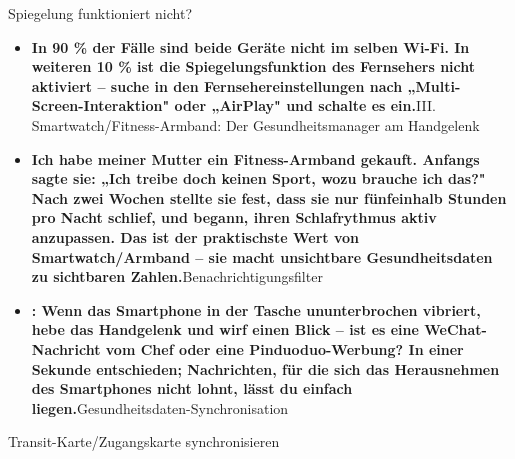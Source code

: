 


Spiegelung funktioniert nicht?

\begin{itemize}
  \item \textbf{In 90 \% der Fälle sind beide Geräte nicht im selben Wi-Fi. In weiteren 10 \% ist die Spiegelungsfunktion des Fernsehers nicht aktiviert – suche in den Fernsehereinstellungen nach „Multi-Screen-Interaktion" oder „AirPlay" und schalte es ein.}III. Smartwatch/Fitness-Armband: Der Gesundheitsmanager am Handgelenk
  \item \textbf{Ich habe meiner Mutter ein Fitness-Armband gekauft. Anfangs sagte sie: „Ich treibe doch keinen Sport, wozu brauche ich das?" Nach zwei Wochen stellte sie fest, dass sie nur fünfeinhalb Stunden pro Nacht schlief, und begann, ihren Schlafrythmus aktiv anzupassen. Das ist der praktischste Wert von Smartwatch/Armband – sie macht unsichtbare Gesundheitsdaten zu sichtbaren Zahlen.}Benachrichtigungsfilter
  \item \textbf{: Wenn das Smartphone in der Tasche ununterbrochen vibriert, hebe das Handgelenk und wirf einen Blick – ist es eine WeChat-Nachricht vom Chef oder eine Pinduoduo-Werbung? In einer Sekunde entschieden; Nachrichten, für die sich das Herausnehmen des Smartphones nicht lohnt, lässt du einfach liegen.}Gesundheitsdaten-Synchronisation
\end{itemize}


Transit-Karte/Zugangskarte synchronisieren

